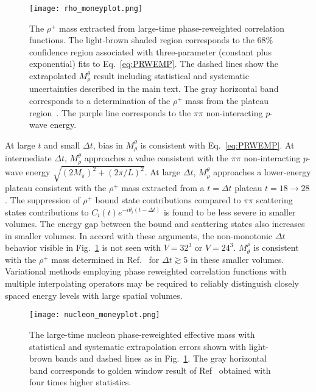 %
\begin{figure}[!t]
  \centering
	\texttt{[image: rho\_moneyplot.png]}
		\caption{
	\label{fig:Rhoextrap} 
        The $\rho^+$ mass extracted from large-time phase-reweighted correlation functions.
	The light-brown shaded region corresponds to the $68\%$ confidence region associated with 	
        three-parameter (constant plus exponential)  fits to Eq.~\eqref{eq:PRWEMP}.
        The dashed lines show the extrapolated $M_\rho^\theta$ result
        including statistical and systematic uncertainties
        described in the main text.
        The gray horizontal band corresponds to a determination of the $\rho^+$ mass from the plateau region~\cite{Orginos:2015aya}.
        The purple line corresponds to the $\pi\pi$ non-interacting $p$-wave energy.	}		
\end{figure}
%

At large $t$ and small $\Delta t$, bias in $M_\rho^\theta$ is consistent with Eq.~\ref{eq:PRWEMP}.
At intermediate $\Delta t$, $M_\rho^\theta$ approaches a value consistent  with the $\pi\pi$ non-interacting $p$-wave energy $\sqrt{(2M_\pi)^2 + (2\pi/L)^2}$. 
At large $\Delta t$, $M_\rho^\theta$ approaches a lower-energy plateau consistent with the $\rho^+$ mass extracted from a $t=\Delta t$ plateau $t = 18 \rightarrow 28$.
The suppression of $\rho^+$ bound state contributions  compared to $\pi\pi$ scattering states contributions to $C_i(t)e^{-i\theta_i(t-\Delta t)}$ is found to be less severe in smaller volumes.
The energy gap between the bound and scattering states also increases in smaller volumes.
In accord with these arguments, the non-monotonic $\Delta t$ behavior visible in Fig.~\ref{fig:Rhoextrap} is not seen with $V=32^3$ or $V=24^3$.
$M_\theta^\rho$ is consistent with the $\rho^+$ mass determined in Ref.~\cite{Orginos:2015aya} for $\Delta t \gtrsim 5$ in these smaller volumes.
Variational methods employing phase reweighted correlation functions
with multiple interpolating operators
may be required 
to reliably distinguish closely spaced energy levels with large spatial volumes.


%
\begin{figure}[!t]
  \centering
	\texttt{[image: nucleon\_moneyplot.png]}
		\caption{
	\label{fig:Nextrap} 
	The large-time nucleon phase-reweighted effective mass with statistical and systematic extrapolation errors shown
        with light-brown bands and dashed lines as in Fig.~\ref{fig:Rhoextrap}.
        The gray horizontal band corresponds to golden window result of Ref~\cite{Orginos:2015aya} obtained with four times higher statistics.
	}		
\end{figure}
%


